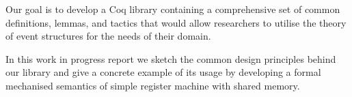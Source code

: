 Our goal is to develop a Coq library containing 
a comprehensive set of common definitions, lemmas, 
and tactics that would allow researchers 
to utilise the theory of event structures 
for the needs of their domain.

In this work in progress report we sketch 
the common design principles behind our library
and give a concrete example of its usage  
by developing a formal mechanised semantics of simple 
register machine with shared memory.
